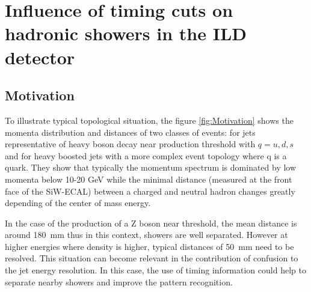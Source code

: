\section{Influence of timing cuts on hadronic showers in the ILD detector}
\label{sec:MCLevelILDTiming}

\subsection{Motivation}

To illustrate typical topological situation, the figure \ref{fig:Motivation} shows the momenta distribution and distances of two classes of events: for jets representative of heavy boson decay near production threshold \ee{}\ra{} \Zqq{} with $q = u,d,s$ and for heavy boosted jets with a more complex event topology \ee{}\ra{} \WWqqqq{} where q is a quark. They show that typically the momentum spectrum is dominated by low momenta below 10-20 GeV while the minimal distance (measured at the front face of the SiW-ECAL) between a charged and neutral hadron changes greatly depending of the center of mass energy.

In the case of the production of a Z boson near threshold, the mean distance is around \SI{180}{\milli\meter} thus in this context, showers are well separated. However at higher energies where density is higher, typical distances of \SI{50}{\milli\meter} need to be resolved. This situation can become relevant in the contribution of confusion to the jet energy resolution. In this case, the use of timing information could help to separate nearby showers and improve the pattern recognition.

